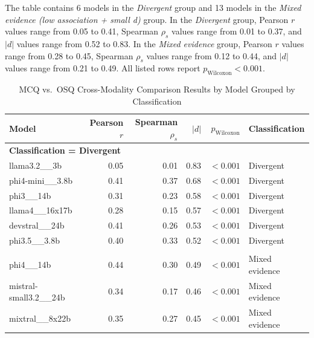 The table contains 6 models in the \emph{Divergent} group and 13 models in the \emph{Mixed evidence (low association + small d)} group. In the \emph{Divergent} group, Pearson \(r\) values range from 0.05 to 0.41, Spearman \(\rho_s\) values range from 0.01 to 0.37, and \(|d|\) values range from 0.52 to 0.83. In the \emph{Mixed evidence} group, Pearson \(r\) values range from 0.28 to 0.45, Spearman \(\rho_s\) values range from 0.12 to 0.44, and \(|d|\) values range from 0.21 to 0.49. All listed rows report \(p_{\text{Wilcoxon}} < 0.001\).

\begin{table}[htbp]
\centering
\caption{MCQ vs.\ OSQ Cross-Modality Comparison Results by Model Grouped by Classification}
\label{tab:mcq_osq_results_summary}
\small
\setlength{\tabcolsep}{4pt}
\renewcommand{\arraystretch}{1.1}
\begin{tabular}{l r r r r l}
\toprule
\textbf{Model} & \textbf{Pearson $r$} & \textbf{Spearman $\rho_s$} & \textbf{$|d|$} & \textbf{$p_{\text{Wilcoxon}}$} & \textbf{Classification} \\
\midrule
\multicolumn{6}{l}{\textbf{Classification = Divergent}} \\
\midrule
    llama3.2\_\_3b & 0.05 & 0.01 & 0.83 & $<0.001$ & Divergent \\
    phi4-mini\_\_3.8b & 0.41 & 0.37 & 0.68 & $<0.001$ & Divergent \\
    phi3\_\_14b & 0.31 & 0.23 & 0.58 & $<0.001$ & Divergent \\
    llama4\_\_16x17b & 0.28 & 0.15 & 0.57 & $<0.001$ & Divergent \\
    devstral\_\_24b & 0.41 & 0.26 & 0.53 & $<0.001$ & Divergent \\
    phi3.5\_\_3.8b & 0.40 & 0.33 & 0.52 & $<0.001$ & Divergent \\
\addlinespace
\multicolumn{6}{l}{\textbf{Classification = Mixed evidence (low association + small d)}} \\
\midrule
    phi4\_\_14b & 0.44 & 0.30 & 0.49 & $<0.001$ & Mixed evidence \\ %
    mistral-small3.2\_\_24b & 0.34 & 0.17 & 0.46 & $<0.001$ & Mixed evidence \\ %
    mixtral\_\_8x22b & 0.35 & 0.27 & 0.45 & $<0.001$ & Mixed evidence \\ %

\end{tabular}
\end{table}
